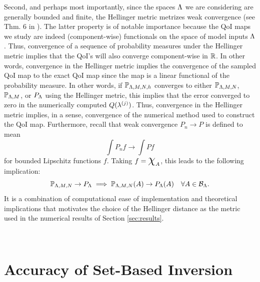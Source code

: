 Second, and perhaps most importantly, since the spaces ${\Lambda}$ we are considering are generally bounded and finite, the Hellinger metric metrizes weak convergence (see Thm. 6 in \cite{GS02}).
The latter property is of notable importance because the QoI maps we study are indeed (component-wise) functionals on the space of model inputs ${\Lambda}$. 
Thus, convergence of a sequence of probability measures under the Hellinger metric implies that the QoI's will also converge component-wise in $\mathbb{R}$. 
In other words, convergence in the Hellinger metric implies the convergence of the sampled QoI map to the exact QoI map since the map is a linear functional of the probability measure. 
In other words, if $\mathbb{P}_{{\Lambda},M,N,h}$ converges to either $\mathbb{P}_{{\Lambda},M,N}$, $\mathbb{P}_{{\Lambda},M}$, or $P_{\Lambda}$ using the Hellinger metric, this implies that the error converged to zero in the numerically computed $Q(\lambda^{(j)})$.
Thus, convergence in the Hellinger metric implies, in a sense, convergence of the numerical method used to construct the QoI map. 
Furthermore, recall that weak convergence $P_n \to P$ is defined to mean 
\[
\int P_n f \to \int Pf
\]
for bounded Lipschitz functions $f$. 
Taking $f = \Chi_A$, this leads to the following implication:  
\[
\mathbb{P}_{{\Lambda}, M, N} \to P_{\Lambda} \implies \mathbb{P}_{{\Lambda}, M, N} (A) \to P_{\Lambda} (A) \quad \forall{A\in\mathcal{B}_{{\Lambda}}}.
\]
It is a combination of computational ease of implementation and theoretical implications that motivates the choice of the Hellinger distance as the metric used in the numerical results of Section \ref{sec:results}.



\
\section{Accuracy of Set-Based Inversion}




